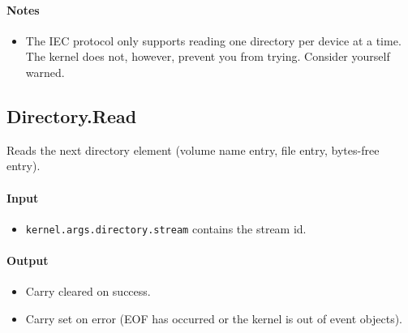 \paragraph{Notes}
\begin{itemize}
\item The IEC protocol only supports reading one directory per device at a time.  The kernel does not, however, prevent you from trying.  Consider yourself warned.
\end{itemize}

\subsection*{Directory.Read}
Reads the next directory element (volume name entry, file entry, bytes-free entry).

\paragraph{Input} 
\begin{itemize}
\item \verb+kernel.args.directory.stream+ contains the stream id.
\end{itemize}

\paragraph{Output}
\begin{itemize}
\item Carry cleared on success.
\item Carry set on error (EOF has occurred or the kernel is out of event objects).
\end{itemize}

